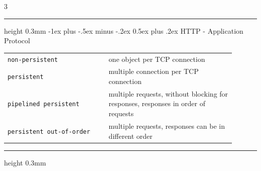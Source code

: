 \documentclass[10pt,landscape]{article}
\makeatletter
\renewcommand{\section}{\@startsection{section}{1}{0mm}%
                                {-1ex plus -.5ex minus -.2ex}%
                                {0.5ex plus .2ex}%
                                {\normalfont\large\bfseries}}
\makeatother
\begin{document}
\raggedright
\footnotesize
\begin{multicols}{3}


\setlength{\premulticols}{1pt}
\setlength{\postmulticols}{1pt}
\setlength{\multicolsep}{1pt}
\setlength{\columnsep}{2pt}

\hrule height 0.3mm
\section{HTTP - Application Protocol}
\begin{tabular}{p{0.40\linewidth}p{0.50\linewidth}}
\verb!non-persistent! & one object per TCP connection \\
\verb!persistent!  & multiple connection per TCP connection \\
\verb!pipelined persistent! & multiple requests, without blocking for responses, responses in order of requests \\
\verb!persistent out-of-order!  & multiple requests, responses can be in different order \\
\end{tabular}
\hrule height 0.3mm 

\end{multicols}
\end{document}
